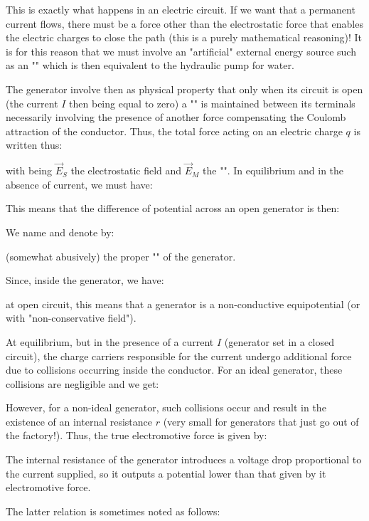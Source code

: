 	This is exactly what happens in an electric circuit. If we want that a permanent current flows, there must be a force other than the electrostatic force that enables the electric charges to close the path (this is a purely mathematical reasoning)! It is for this reason that we must involve an "artificial" external energy source such as an "" which is then equivalent to the hydraulic pump for water.
	
	The generator involve then as physical property that only when its circuit is open (the current $I$ then being equal to zero) a "" is maintained between its terminals necessarily involving the presence of another force compensating the Coulomb attraction of the conductor. Thus, the total force acting on an electric charge $q$ is written thus:
	
	with being $\vec{E}_S$ the electrostatic field and $\vec{E}_M$ the "". In equilibrium and in the absence of current, we must have:
	
	This means that the difference of potential across an open generator is then:
	
	We name and denote by:
	
	(somewhat abusively) the proper "" of the generator.
	
	Since, inside the generator, we have:
	
	at open circuit, this means that a generator is a non-conductive equipotential (or with "non-conservative field").

	At equilibrium, but in the presence of a current $I$ (generator set in a closed circuit), the charge carriers responsible for the current undergo additional force due to collisions occurring inside the conductor. For an ideal generator, these collisions are negligible and we get:
	
	However, for a non-ideal generator, such collisions occur and result in the existence of an internal resistance $r$ (very small for generators that just go out of the factory!). Thus, the true electromotive force is given by:
	
	The internal resistance of the generator introduces a voltage drop proportional to the current supplied, so it outputs a potential lower than that given by it electromotive force.
	
	The latter relation is sometimes noted as follows:
	
